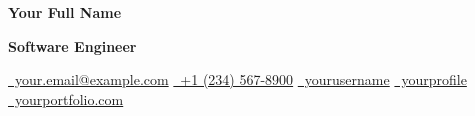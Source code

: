 \begin{center}
    {\Huge\bfseries\color{primaryblue} Your Full Name}
    
    \vspace{4pt}
    
    {\large\color{secondaryblue}\textbf{Software Engineer}}
    
    \vspace{6pt}
    
    \small\href{mailto:your.email@example.com}{\faEnvelope\ your.email@example.com} \quad
    \href{tel:+1234567890}{\faPhone\ +1 (234) 567-8900} \quad
    \href{https://github.com/yourusername}{\faGithub\ yourusername} \quad
    \href{https://linkedin.com/in/yourprofile}{\faLinkedin\ yourprofile} \quad
    \href{https://yourportfolio.com}{\faGlobe\ yourportfolio.com}
\end{center}

\vspace{8pt} 